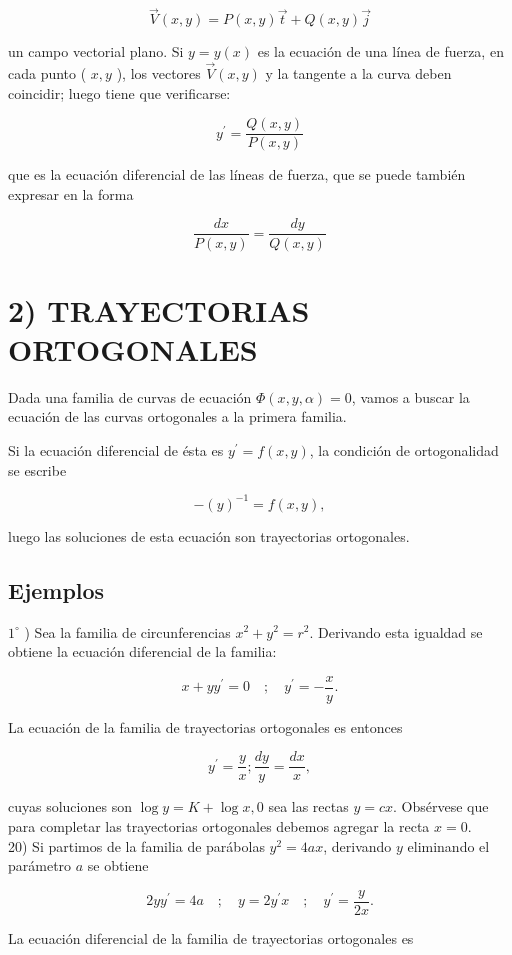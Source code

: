 \documentclass[10pt]{article}
\theoremstyle{plain}
\theoremstyle{definition}
\theoremstyle{remark}
\begin{document}
$$
\vec{V}(x, y)=P(x, y) \vec{t}+Q(x, y) \vec{j}
$$

un campo vectorial plano. Si $y=y(x)$ es la ecuación de una línea de fuerza, en cada punto ( $x, y$ ), los vectores $\vec{V}(x, y)$ y la tangente a la curva deben coincidir; luego tiene que verificarse:

$$
y^{\prime}=\frac{Q(x, y)}{P(x, y)}
$$

que es la ecuación diferencial de las líneas de fuerza, que se puede también expresar en la forma

$$
\frac{d x}{P(x, y)}=\frac{d y}{Q(x, y)}
$$


\section*{2) TRAYECTORIAS ORTOGONALES}
Dada una familia de curvas de ecuación $\Phi(x, y, \alpha)=0$, vamos a buscar la ecuación de las curvas ortogonales a la primera familia.

Si la ecuación diferencial de ésta es $y^{\prime}=f(x, y)$, la condición de ortogonalidad se escribe

$$
-(y)^{-1}=f(x, y),
$$

luego las soluciones de esta ecuación son trayectorias ortogonales.

\subsection*{Ejemplos}
$1^{\circ}$ ) Sea la familia de circunferencias $x^{2}+y^{2}=r^{2}$. Derivando esta igualdad se obtiene la ecuación diferencial de la familia:

$$
x+y y^{\prime}=0 \quad ; \quad y^{\prime}=-\frac{x}{y} .
$$

La ecuación de la familia de trayectorias ortogonales es entonces

$$
y^{\prime}=\frac{y}{x} ; \frac{d y}{y}=\frac{d x}{x},
$$

cuyas soluciones son $\log y=K+\log x, 0$ sea las rectas $y=c x$. Obsérvese que para completar las trayectorias ortogonales debemos agregar la recta $x=0$.\\
20) Si partimos de la familia de parábolas $y^{2}=4 a x$, derivando $y$ eliminando el parámetro $a$ se obtiene

$$
2 y y^{\prime}=4 a \quad ; \quad y=2 y^{\prime} x \quad ; \quad y^{\prime}=\frac{y}{2 x} .
$$

La ecuación diferencial de la familia de trayectorias ortogonales es
\end{document}

